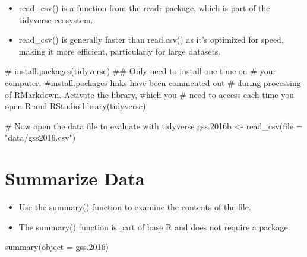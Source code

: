 \documentclass[
  letterpaper,
  DIV=11,
  numbers=noendperiod]{scrreprt}
\newenvironment{Shaded}{\begin{snugshade}}{\end{snugshade}}
\newcommand{\AttributeTok}[1]{\textcolor[rgb]{0.40,0.45,0.13}{#1}}
\newcommand{\CommentTok}[1]{\textcolor[rgb]{0.37,0.37,0.37}{#1}}
\newcommand{\FloatTok}[1]{\textcolor[rgb]{0.68,0.00,0.00}{#1}}
\newcommand{\FunctionTok}[1]{\textcolor[rgb]{0.28,0.35,0.67}{#1}}
\newcommand{\NormalTok}[1]{\textcolor[rgb]{0.00,0.23,0.31}{#1}}
\newcommand{\OtherTok}[1]{\textcolor[rgb]{0.00,0.23,0.31}{#1}}
\newcommand{\StringTok}[1]{\textcolor[rgb]{0.13,0.47,0.30}{#1}}
\providecommand{\tightlist}{%
  \setlength{\itemsep}{0pt}\setlength{\parskip}{0pt}}\usepackage{longtable,booktabs,array}
\begin{document}
\begin{itemize}
\tightlist
\item
  read\_csv() is a function from the readr package, which is part of the
  tidyverse ecosystem.
\item
  read\_csv() is generally faster than read.csv() as it's optimized for
  speed, making it more efficient, particularly for large datasets.
\end{itemize}

\begin{Shaded}
\begin{Highlighting}[]
\CommentTok{\# install.packages(tidyverse) \#\# Only need to install one time on}
\CommentTok{\# your computer. \#install.packages links have been commented out}
\CommentTok{\# during processing of RMarkdown.  Activate the library, which you}
\CommentTok{\# need to access each time you open R and RStudio}
\FunctionTok{library}\NormalTok{(tidyverse)}
\end{Highlighting}
\end{Shaded}

\begin{Shaded}
\begin{Highlighting}[]
\CommentTok{\# Now open the data file to evaluate with tidyverse}
\NormalTok{gss}\FloatTok{.2016}\NormalTok{b }\OtherTok{\textless{}{-}} \FunctionTok{read\_csv}\NormalTok{(}\AttributeTok{file =} \StringTok{"data/gss2016.csv"}\NormalTok{)}
\end{Highlighting}
\end{Shaded}

\section{Summarize Data}\label{summarize-data}

\begin{itemize}
\tightlist
\item
  Use the summary() function to examine the contents of the file.
\item
  The summary() function is part of base R and does not require a
  package.
\end{itemize}

\begin{Shaded}
\begin{Highlighting}[]
\FunctionTok{summary}\NormalTok{(}\AttributeTok{object =}\NormalTok{ gss}\FloatTok{.2016}\NormalTok{)}
\end{Highlighting}
\end{Shaded}
\end{document}
